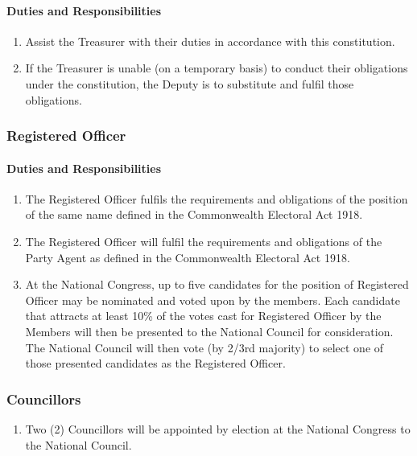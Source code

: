 \documentclass[a4paper,titlepage,8.5pt]{article}
\begin{document}
\paragraph{Duties and Responsibilities}

\begin{enumerate}
\item Assist the Treasurer with their duties in accordance with this constitution.
\item If the Treasurer is unable (on a temporary basis) to conduct their obligations under the constitution, the Deputy is to substitute and fulfil those obligations.
\end{enumerate}

\subsubsection{Registered Officer}

\paragraph{Duties and Responsibilities}

\begin{enumerate}
\item The Registered Officer fulfils the requirements and obligations of the position of the same name defined in the Commonwealth Electoral Act 1918.
\item The Registered Officer will fulfil the requirements and obligations of the Party Agent as defined in the Commonwealth Electoral Act 1918.
\item At the National Congress, up to five candidates for the position of Registered Officer may be nominated and voted upon by the members. Each candidate that attracts at least 10\% of the votes cast for Registered Officer by the Members will then be presented to the National Council for consideration. The National Council will then vote (by 2/3rd majority) to select one of those presented candidates as the Registered Officer.
\end{enumerate}

\subsubsection{Councillors}

\begin{enumerate}
\item Two (2) Councillors will be appointed by election at the National Congress to the National Council.
\end{enumerate}
\end{document}
